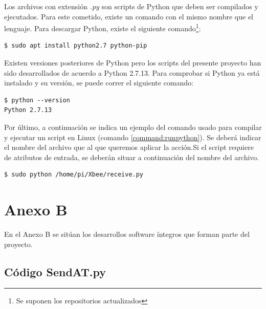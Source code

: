 Los archivos con extensión \textit{.py} son scripts de Python que deben ser compilados y ejecutados. Para este cometido, existe un comando con el mismo nombre que el lenguaje. Para descargar Python, existe el siguiente comando\footnote{Se suponen los repositorios actualizados}:

\begin{lstlisting}[frame=single, label=command:installpython]
$ sudo apt install python2.7 python-pip
\end{lstlisting} 

Existen versiones posteriores de Python pero los scripts del presente proyecto han sido desarrollados de acuerdo a Python 2.7.13. Para comprobar si Python ya está instalado y su versión, se puede correr el siguiente comando:

\begin{lstlisting}[frame=single, label=command:checkpython]
$ python --version
Python 2.7.13
\end{lstlisting} 

Por último, a continuación se indica un ejemplo del comando usado para compilar y ejecutar un script en Linux (comando \ref{command:runpython}). Se deberá indicar el nombre del archivo que  al que queremos aplicar la acción.Si el script requiere de atributos de entrada, se deberán situar a continuación del nombre del archivo.

\begin{lstlisting}[frame=single, label=command:runpython]
$ sudo python /home/pi/Xbee/receive.py
\end{lstlisting} 

\chapter{Anexo B}

En el Anexo B se sitúan los desarrollos software íntegros que forman parte del proyecto.


\section{Código SendAT.py}\label{anexo:sendAT}


